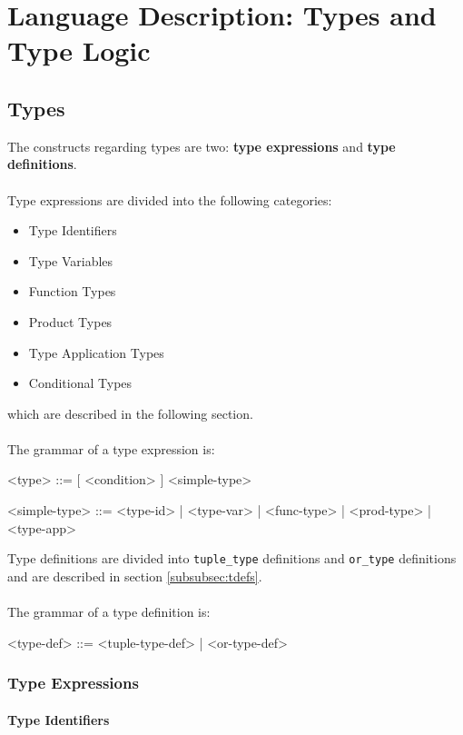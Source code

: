 \documentclass{article}
\begin{document}
\section{Language Description: Types and Type Logic}

\subsection{Types}
\label{subsec:types}

The constructs regarding types are two: \textbf{type expressions} and
\textbf{type definitions}.
\\\\
Type expressions are divided into the following categories:
\begin{itemize}
\item Type Identifiers
\item Type Variables
\item Function Types
\item Product Types
\item Type Application Types
\item Conditional Types
\end{itemize}
which are described in the following section.
\\\\
The grammar of a type expression is:
\begin{grammar}
<type> ::= [ <condition> ]  <simple-type> 

<simple-type> ::= <type-id> | <type-var> | <func-type> | <prod-type> | <type-app>
\\
\end{grammar}
Type definitions are divided into \texttt{tuple_type} definitions and
\texttt{or_type} definitions and are described in section
\ref{subsubsec:tdefs}.
\\\\
The grammar of a type definition is:
\begin{grammar}
<type-def> ::= <tuple-type-def> | <or-type-def>
\end{grammar}

\subsubsection{Type Expressions}

\paragraph{Type Identifiers}
\end{document}
